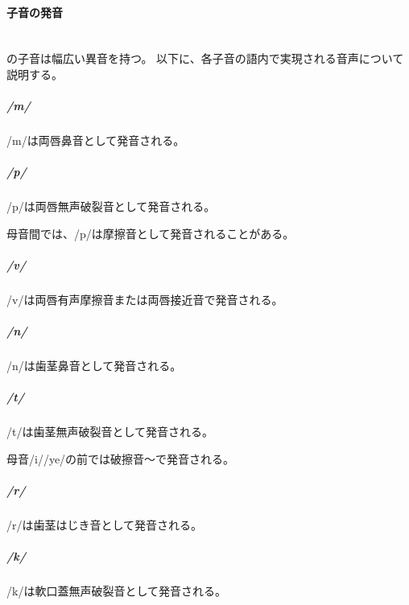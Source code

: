 \paragraph{子音の発音}\quad\\
\langname の子音は幅広い異音を持つ。
以下に、各子音の語内で実現される音声について説明する。

\subparagraph{/m/}
/m/は両唇鼻音\textipa{[m]}として発音される。

\subparagraph{/p/}
/p/は両唇無声破裂音\textipa{[p]}として発音される。

母音間では、/p/は摩擦音\textipa{[F]}として発音されることがある。

\subparagraph{/v/}
/v/は両唇有声摩擦音\textipa{[B]}または両唇接近音\textipa{[\textlowering{B}]}で発音される。

\subparagraph{/n/}
/n/は歯茎鼻音\textipa{[n]}として発音される。

\subparagraph{/t/}
/t/は歯茎無声破裂音\textipa{[p]}として発音される。

母音/i//ye/の前では破擦音\textipa{[\t{ts}]}～\textipa{[\t{tS}]}で発音される。

\subparagraph{/r/}
/r/は歯茎はじき音\textipa{[R]}として発音される。

\subparagraph{/k/}
/k/は軟口蓋無声破裂音\textipa{[k]}として発音される。
